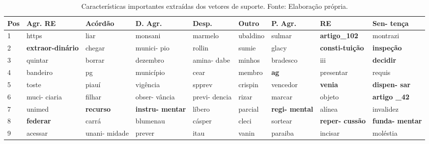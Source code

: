 \begin{table}
  \centering
  \caption{Características importantes extraídas dos vetores de suporte. Fonte: Elaboração própria.}
  \label{tab:caracteristicasImportantes}
  \begin{tabular}{|p{1cm}|p{1.5cm}|p{1.5cm}|p{1.5cm}|p{1.5cm}|p{1.5cm}|p{1.5cm}|p{1.5cm}|p{1.5cm}|}
  	\hline
	\textbf{Pos} & \textbf{Agr. RE} & \textbf{Acórdão} & \textbf{D. Agr.} & \textbf{Desp.} & \textbf{Outro} & \textbf{P. Agr.} & \textbf{RE} & \textbf{Sen- \newline tença} \\ \hline
	1 &  https & liar & monsani & marmelo & ubaldino & sulmar & \textbf{artigo\newline\_102} & montrazi \\ \hline
	2 &  \textbf{extraor-\newline dinário} & chegar & munici- \newline pio & rollin & sumie & glacy & \textbf{consti-\newline tuição} & \textbf{inspeção} \\ \hline
    3 &  quintar & borrar & dezembro & amina- \newline dabe & minhos & bradesco & iii & \textbf{decidir} \\ \hline
    4 &  bandeiro & pg & município & cear & membro & \textbf{ag} & presentar & requis \\ \hline
    5 &  toste & piauí & vigência & spprev & crispin & vencedor & \textbf{venia} & \textbf{dispen- \newline sar} \\ \hline
    6 &  muci- \newline ciaria & filhar & obser- \newline vância & previ- \newline dencia & rizar & marcar & objeto & \textbf{artigo \newline \_42} \\ \hline
    7 &  unimed & \textbf{recurso} & \textbf{instru- \newline mentar} & líbero & parcial & \textbf{regi- \newline mental} & alínea & invalidez \\ \hline
    8 &  \textbf{federar} & carrá & blumenau & cásper & cleci & sortear & \textbf{reper- \newline cussão} & \textbf{funda- \newline mentar} \\ \hline
    9 &  acessar & unani- \newline midade & prever & itau & vanin & paraiba & incisar & moléstia \\ \hline

\end{tabular}
\end{table}
